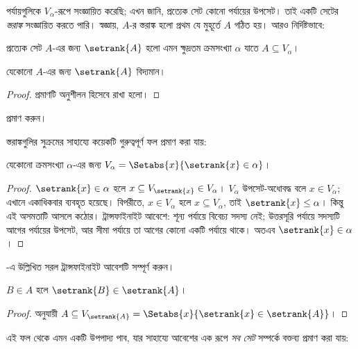 \documentclass[../../../include/open-logic-section]{subfiles}
\begin{document}

পর্যায়গুলিকে $V_\alpha$-রূপে সংজ্ঞায়িত করেছি;
এখন জানি, প্রত্যেক সেট কোনো পর্যায়ের উপসেট।
তাই একটি সেটের \emph{স্তরাঙ্ক} সংজ্ঞায়িত করতে
পারি। স্বজ্ঞায়, $A$-র স্তরাঙ্ক হলো প্রথম যে
মুহূর্তে $A$ গঠিত হয়। আরও নির্দিষ্টভাবে:

\begin{defn}
প্রত্যেক সেট $A$-এর জন্য $\setrank{A}$ হলো
এমন ক্ষুদ্রতম ক্রমসংখ্যা $\alpha$ যাতে
$A
\subseteq V_\alpha$।
\end{defn}
\begin{prop}
	যেকোনো $A$-এর জন্য $\setrank{A}$ বিদ্যমান।
\end{prop}
\begin{proof}
	প্রমাণটি অনুশীলন হিসেবে রাখা হলো।
\end{proof}
\begin{prob}
	 প্রমাণ করুন।
\end{prob}
\noindent
স্তরাঙ্কগুলির সুক্রমের সাহায্যে কয়েকটি
গুরুত্বপূর্ণ ফল প্রমাণ করা যায়:
\begin{prop}
যেকোনো ক্রমসংখ্যা $\alpha$-এর জন্য
$V_\alpha = \Setabs{x}{\setrank{x} \in \alpha}$।
\end{prop}

\begin{proof}
$\setrank{x} \in \alpha$ হলে
$x \subseteq V_{\setrank{x}} \in
V_\alpha$। $V_\alpha$ উপসেট-অধোবদ্ধ
বলে $x \in V_\alpha$; এখানে
একাধিকবার ব্যবহৃত হয়েছে। বিপরীতে,
$x \in V_\alpha$ হলে $x \subseteq V_\alpha$,
তাই $\setrank{x} \leq \alpha$।
কিন্তু এই অসমতাটি আসলে কঠোর।
ট্রান্সফাইনাইট আবেশে: শূন্য পর্যায়ে
বিবেচ্য সদস্য নেই; উত্তরসূরি পর্যায়ে
সদস্যটি আগের পর্যায়ের উপসেট, আর সীমা
পর্যায়ে তা আগের কোনো একটি পর্যায়ে থাকে।
অতএব $\setrank{x} \in \alpha$।
\end{proof}
\begin{prob}
	-এ
	উল্লিখিত সরল ট্রান্সফাইনাইট আবেশটি সম্পূর্ণ
	করুন।
\end{prob}

\begin{prop}
$B \in A$ হলে $\setrank{B} \in \setrank{A}$।
\end{prop}

\begin{proof}
 অনুযায়ী
$A \subseteq V_{\setrank{A}} = \Setabs{x}{\setrank{x} \in
\setrank{A}}$।
\end{proof}
\noindent
এই ফল থেকে এমন একটি উপপাদ্য পাব, যার
সাহায্যে আবেশের এক রূপে \emph{সব সেট}
সম্পর্কে বক্তব্য প্রমাণ করা যায়:
\end{document}
